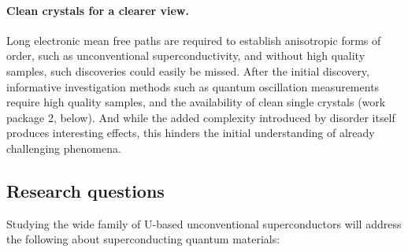 \paragraph{Clean crystals for a clearer view.} Long electronic mean free paths are required to establish anisotropic forms of order, such as unconventional superconductivity, and without high quality samples, such discoveries could easily be missed. After the initial discovery, informative investigation methods such as quantum oscillation measurements require high quality samples, and the availability of clean single crystals  (work package 2, below). And while the added complexity introduced by disorder itself produces interesting effects, this hinders the initial understanding of already challenging phenomena. %



\subsection*{Research questions}
\noindent



Studying the wide family of U-based unconventional superconductors will address the following   about superconducting quantum materials:

